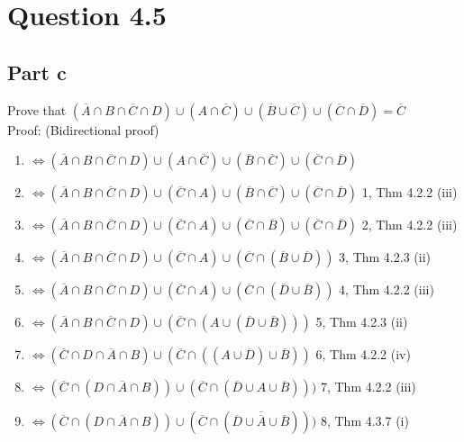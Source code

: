 \documentclass{article}
\begin{document}
	\section{Question 4.5}
		\subsection{Part c}
			Prove that $(\overline{A} \cap B \cap \overline{C} \cap D) \cup (A \cap \overline{C}) \cup (\overline{B} \cup \overline{C}) \cup (\overline{C} \cap \overline{D}) = \overline{C}$ \\
			Proof: (Bidirectional proof)
			\begin{enumerate}
				\item $\Leftrightarrow (\overline{A} \cap B \cap \overline{C} \cap D) \cup (A \cap \overline{C}) \cup (\overline{B} \cap \overline{C}) \cup (\overline{C} \cap \overline{D})$
				\item $\Leftrightarrow (\overline{A} \cap B \cap \overline{C} \cap D) \cup (\overline{C} \cap A) \cup (\overline{B} \cap \overline{C}) \cup (\overline{C} \cap \overline{D})$ \hfill 1, Thm 4.2.2 (iii)
				\item $\Leftrightarrow (\overline{A} \cap B \cap \overline{C} \cap D) \cup (\overline{C} \cap A) \cup (\overline{C} \cap \overline{B}) \cup (\overline{C} \cap \overline{D})$ \hfill 2, Thm 4.2.2 (iii)
				\item $\Leftrightarrow (\overline{A} \cap B \cap \overline{C} \cap D) \cup (\overline{C} \cap A) \cup (\overline{C} \cap (\overline{B} \cup \overline{D}))$ \hfill 3, Thm 4.2.3 (ii)
				\item $\Leftrightarrow (\overline{A} \cap B \cap \overline{C} \cap D) \cup (\overline{C} \cap A) \cup (\overline{C} \cap (\overline{D} \cup \overline{B}))$ \hfill 4, Thm 4.2.2 (iii)
				\item $\Leftrightarrow (\overline{A} \cap B \cap \overline{C} \cap D) \cup (\overline{C} \cap (A \cup (\overline{D} \cup \overline{B})))$ \hfill 5, Thm 4.2.3 (ii)
				\item $\Leftrightarrow (\overline{C} \cap D \cap \overline{A} \cap B) \cup (\overline{C} \cap ((A \cup \overline{D}) \cup \overline{B}))$ \hfill 6, Thm 4.2.2 (iv)
				\item $\Leftrightarrow (\overline{C} \cap (D \cap \overline{A} \cap B)) \cup (\overline{C} \cap (\overline{D} \cup A \cup \overline{B})))$ \hfill 7, Thm 4.2.2 (iii)
				\item $\Leftrightarrow (\overline{C} \cap (D \cap \overline{A} \cap B)) \cup (\overline{C} \cap (\overline{D} \cup \overline{\overline{A}} \cup \overline{B})))$ \hfill 8, Thm 4.3.7 (i)

\end{enumerate}
\end{document}
